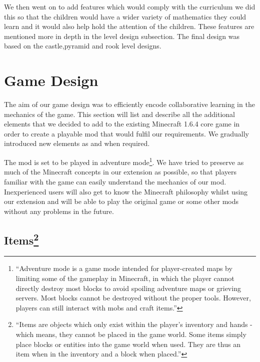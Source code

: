 We then went on to add features which would comply with the curriculum we did this so that the children would have a wider variety of mathematics they could learn and it would also help hold the attention of the children. These features are mentioned more in depth in the level design subsection. The final design was based on the castle,pyramid and rook level designs.

\section{Game Design}
The aim of our game design was to efficiently encode collaborative learning in the mechanics of the game. This section will list and describe all the additional elements that we decided to add to the existing Minecraft 1.6.4 core game in order to create a playable mod that would fulfil our requirements. We gradually introduced new elements as and when required.

The mod is set to be played in adventure mode\footnote{``Adventure mode is a game mode intended for player-created maps by limiting some of the gameplay in Minecraft, in which the player cannot directly destroy most blocks to avoid spoiling adventure maps or grieving servers. Most blocks cannot be destroyed without the proper tools. However, players can still interact with mobs and craft items.''\cite{website:minecraft-adventure}}.
We have tried to preserve as much of the Minecraft concepts in our extension as possible, so that players familiar with the game can easily understand the mechanics of our mod. Inexperienced users will also get to know the Minecraft philosophy whilst using our extension and will be able to play the original game or some other mods without any problems in the future.

\subsection[Items]{Items\footnote{``Items are objects which only exist within the player's inventory and hands - which means, they cannot be placed in the game world. Some items simply place blocks or entities into the game world when used. They are thus an item when in the inventory and a block when placed.''\cite{website:minecraft-item}}}

